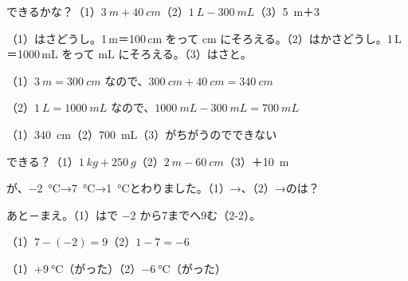 \begin{reidai}
できるかな？\quad（1）\nobreak $\qty{3}{m}+\qty{40}{cm}$\quad（2）\nobreak $\qty{1}{L}-\qty{300}{mL}$\quad（3）\nobreak \mbox{\qty{5}{m}＋3}\par
\kangaekata （1）はさどうし。1\,m＝100\,cm をって cm にそろえる。（2）はかさどうし。1\,L＝1000\,mL をって mL にそろえる。（3）はさと。\par
\shiki （1）\nobreak $\qty{3}{m}=\qty{300}{cm}$ なので、$\qty{300}{cm}+\qty{40}{cm}=\qty{340}{cm}$\par
\hspace*{2.6\zw}（2）\nobreak $\qty{1}{L}=\qty{1000}{mL}$ なので、$\qty{1000}{mL}-\qty{300}{mL}=\qty{700}{mL}$\par
\kotae （1）\nobreak \qty{340}{cm}\hspace{1.5\zw}（2）\nobreak \qty{700}{mL}\hspace{1.5\zw}（3）\nobreak {}がちがうのでできない
\end{reidai}

\begin{jibun}
できる？\enspace（1）\nobreak $\qty{1}{kg}+\qty{250}{g}$\enspace（2）\nobreak $\qty{2}{m}-\qty{60}{cm}$\enspace（3）＋\qty{10}{m}
\end{jibun}

\begin{reidai}
が、\qty{-2}{\degreeCelsius}→\qty{7}{\degreeCelsius}→\qty{1}{\degreeCelsius}とわりました。（1）\nobreak {}→、（2）\nobreak {}→のは？\par
\kangaekata あと－まえ。（1）はで $-2$ から7までへ9む（2-2）。\par
\shiki （1）\nobreak $7-(-2)=9$\hspace{2\zw}（2）\nobreak $1-7=-6$\par
\kotae （1）\nobreak $+\qty{9}{\degreeCelsius}$（がった）\hspace{1.5\zw}（2）\nobreak $\qty{-6}{\degreeCelsius}$（がった）
\end{reidai}

